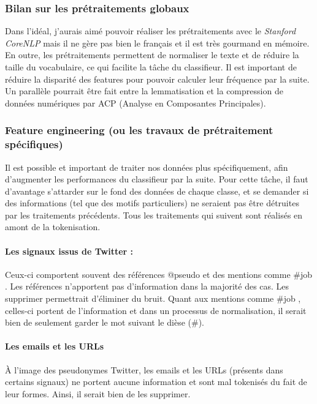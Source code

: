             \subsubsection{Bilan sur les prétraitements globaux}
                Dans l'idéal, j'aurais aimé pouvoir réaliser les prétraitements avec le \textit{Stanford CoreNLP} mais il ne gère pas bien le français et il est très gourmand en mémoire.\\
                En outre, les prétraitements permettent de normaliser le texte et de réduire la taille du vocabulaire, ce qui facilite la tâche du classifieur. Il est important de réduire la disparité des features pour pouvoir calculer leur fréquence par la suite.\\
                Un parallèle pourrait être fait entre la lemmatisation et la compression de données numériques par ACP (Analyse en Composantes Principales).

            \subsubsection{Feature engineering (ou les travaux de prétraitement spécifiques)}
            \label{ssubsec:feature_engineering}
                Il est possible et important de traiter nos données plus spécifiquement, afin d'augmenter les performances du classifieur par la suite. Pour cette tâche, il faut d'avantage s'attarder sur le fond des données de chaque classe, et se demander si des informations (tel que des motifs particuliers) ne seraient pas être détruites par les traitements précédents. Tous les traitements qui suivent sont réalisés en amont de la tokenisation.

                \paragraph{Les signaux issus de Twitter :}
                    Ceux-ci comportent souvent des références \og @pseudo \fg et des mentions comme \og \#job \fg. Les références n'apportent pas d'information dans la majorité des cas. Les supprimer permettrait d’éliminer du bruit. Quant aux mentions comme \og \#job \fg, celles-ci portent de l'information et dans un processus de normalisation, il serait bien de seulement garder le mot suivant le dièse (\#).

                \paragraph{Les emails et les URLs}
                    À l'image des pseudonymes Twitter, les emails et les URLs (présents dans certains signaux) ne portent aucune information et sont mal tokenisés du fait de leur formes. Ainsi, il serait bien de les supprimer.

